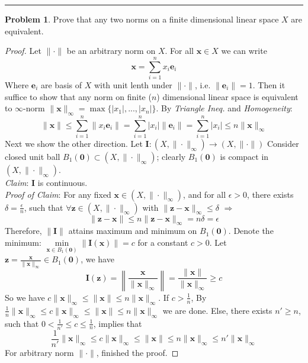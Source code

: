 \documentclass[a4paper, 10pt]{article}
\theoremstyle{definition}
\newtheorem{problem}{Problem}
\theoremstyle{hSol}
\begin{document}
\noindent\rule{16cm}{0.4pt}
\begin{problem} Prove that any two norms on a finite dimensional linear space $X$ are equivalent.
\end{problem}
\begin{proof} Let $\|\cdot\|$ be an arbitrary norm on $X$. For all $\bm{x}\in X$ we can write
\begin{equation}
  \bm{x} = \sum_{i=1}^n x_i \bm{e}_i
\end{equation}
Where $\bm{e}_i$ are basis of $X$ with unit lenth under $\|\cdot\|$, i.e. $\|\bm{e}_i\|=1$. Then it suffice to show that any norm on finite ($n$) dimensional linear space is equivalent to $\infty$-norm $\|\bm{x}\|_{\infty}=\max\{|x_1|, ..., |x_n|\}$. By \textit{Triangle Ineq.} and \textit{Homogeneity}:
\begin{equation}
  \|\bm{x}\|\leq \sum_{i=1}^n \|x_i \bm{e}_i\| = \sum_{i=1}^n |x_i| \|\bm{e}_i\| = \sum_{i=1}^n |x_i| \leq n \|\bm{x}\|_{\infty}
\end{equation}
Next we show the other direction. Let $\bm{I}:(X, \|\cdot\|_{\infty})\to (X, \|\cdot\|)$ Consider closed unit ball $B_{1}(\bm{0}) \subset (X, \|\cdot\|_{\infty})$; clearly $B_1(\bm{0})$ is compact in $(X, \|\cdot\|_{\infty})$. \\
\textit{Claim}: $\bm{I}$ is continuous.\\
\textit{Proof of Claim}: For any fixed $\bm{x}\in (X, \|\cdot\|_{\infty})$, and for all $\epsilon>0$, there exists $\delta=\frac{\epsilon}{n}$, such that $\forall \bm{z}\in (X, \|\cdot\|_{\infty})$ with $\|\bm{z}-\bm{x}\|_{\infty}\leq \delta$ $\Rightarrow$
\begin{equation}
  \|\bm{z}-\bm{x}\|\leq n\|\bm{z}-\bm{x}\|_{\infty} = n \delta = \epsilon
\end{equation}
Therefore, $\|\bm{I}\|$ attains maximum and minimum on $B_1(\bm{0})$. Denote the minimum: $\min\limits_{\bm{x}\in B_1(\bm{0})}\|\bm{I}(\bm{x})\|=c$ for a constant $c>0$. Let $\bm{z}=\frac{\bm{x}}{\|\bm{x}\|_{\infty}}\in B_1(\bm{0})$, we have 
\begin{equation}
  \bm{I}(\bm{z}) = \left\|\frac{\bm{x}}{\|\bm{x}\|_{\infty}}\right\| = \frac{\|\bm{x}\|}{\|\bm{x}\|_{\infty}} \geq c
\end{equation}
So we have $c\|\bm{x}\|_{\infty} \leq \|\bm{x}\|\leq n \|\bm{x}\|_{\infty}$. If $c>\frac{1}{n}$, By $\frac{1}{n} \|\bm{x}\|_{\infty} \leq c\|\bm{x}\|_{\infty} \leq \|\bm{x}\|\leq n \|\bm{x}\|_{\infty}$ we are done. Else, there exists $n'\geq n$, such that $0<\frac{1}{n'}\leq c \leq \frac{1}{n}$, implies that
\begin{equation}
  \frac{1}{n'} \|\bm{x}\|_{\infty} \leq c\|\bm{x}\|_{\infty} \leq \|\bm{x}\|\leq n \|\bm{x}\|_{\infty} \leq n' \|\bm{x}\|_{\infty}
\end{equation}
For arbitrary norm $\|\cdot\|$, finished the proof.
\end{proof} 
\end{document}
